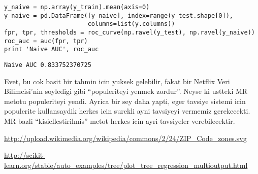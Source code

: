 \documentclass[12pt,fleqn]{article}\usepackage{../common}
\begin{document}
\begin{verbatim}
y_naive = np.array(y_train).mean(axis=0)
y_naive = pd.DataFrame([y_naive], index=range(y_test.shape[0]), 
                       columns=list(y.columns))
fpr, tpr, thresholds = roc_curve(np.ravel(y_test), np.ravel(y_naive))
roc_auc = auc(fpr, tpr)
print 'Naive AUC', roc_auc
\end{verbatim}

\begin{verbatim}
Naive AUC 0.833752370725
\end{verbatim}

Evet, bu cok basit bir tahmin
icin yuksek gelebilir, fakat bir Netflix Veri Bilimcisi'nin soyledigi gibi
``populeriteyi yenmek zordur''. Neyse ki ustteki MR metotu populeriteyi
yendi. Ayrica bir sey daha yapti, eger tavsiye sistemi icin populerite
kullansaydik herkes icin surekli ayni tavsiyeyi vermemiz gerekecekti. MR
bazli ``kisiellestirilmis'' metot herkes icin ayri tavsiyeler
verebilecektir.


\url{http://upload.wikimedia.org/wikipedia/commons/2/24/ZIP_Code_zones.svg}

\url{http://scikit-learn.org/stable/auto_examples/tree/plot_tree_regression_multioutput.html}
\end{document}
